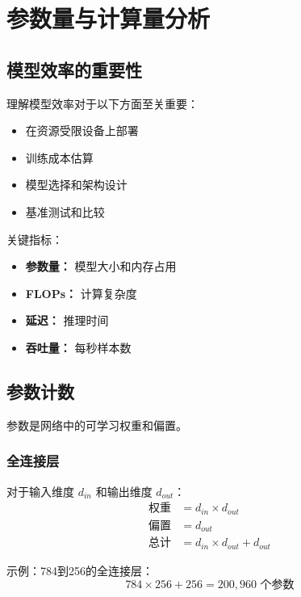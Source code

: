 %

\clearpage
\cleardoublepage

\chapter{参数量与计算量分析}

\section{模型效率的重要性}

理解模型效率对于以下方面至关重要：
\begin{itemize}
    \item 在资源受限设备上部署
    \item 训练成本估算
    \item 模型选择和架构设计
    \item 基准测试和比较
\end{itemize}

关键指标：
\begin{itemize}
    \item \textbf{参数量：} 模型大小和内存占用
    \item \textbf{FLOPs：} 计算复杂度
    \item \textbf{延迟：} 推理时间
    \item \textbf{吞吐量：} 每秒样本数
\end{itemize}

\section{参数计数}

参数是网络中的可学习权重和偏置。

\subsection{全连接层}

对于输入维度 $d_{in}$ 和输出维度 $d_{out}$：
\begin{align}
\text{权重} &= d_{in} \times d_{out} \\
\text{偏置} &= d_{out} \\
\text{总计} &= d_{in} \times d_{out} + d_{out}
\end{align}

示例：784到256的全连接层：
\begin{equation}
784 \times 256 + 256 = 200,960 \text{ 个参数}
\end{equation}

